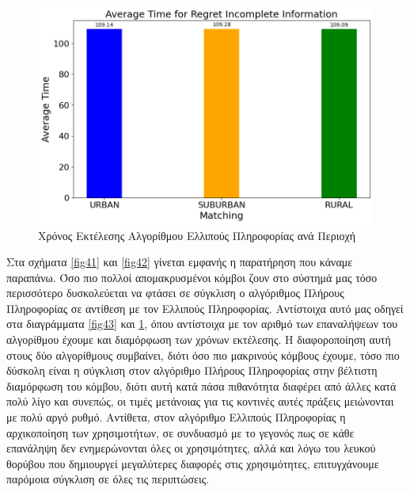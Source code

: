 \begin{figure}[H]
    \centering
    \includegraphics[width=\textwidth]{figures/chapter4/Average_Time_per_area_RII.png}
    \caption{Χρόνος Εκτέλεσης Αλγορίθμου Ελλιπούς Πληροφορίας ανά Περιοχή}
    \label{fig44}
\end{figure}

\newpage

Στα σχήματα \ref{fig41} και \ref{fig42} γίνεται εμφανής η παρατήρηση που κάναμε παραπάνω. Όσο πιο πολλοί απομακρυσμένοι κόμβοι ζουν στο σύστημά μας τόσο περισσότερο δυσκολεύεται να φτάσει σε σύγκλιση ο αλγόριθμος Πλήρους Πληροφορίας σε αντίθεση με τον Ελλιπούς Πληροφορίας. Αντίστοιχα αυτό μας οδηγεί στα διαγράμματα \ref{fig43} και \ref{fig44}, όπου αντίστοιχα με τον αριθμό των επαναλήψεων του αλγορίθμου έχουμε και διαμόρφωση των χρόνων εκτέλεσης. Η διαφοροποίηση αυτή στους δύο αλγορίθμους συμβαίνει, διότι όσο πιο μακρινούς κόμβους έχουμε, τόσο πιο δύσκολη είναι η σύγκλιση στον αλγόριθμο Πλήρους Πληροφορίας στην βέλτιστη διαμόρφωση του κόμβου, διότι αυτή κατά πάσα πιθανότητα διαφέρει από άλλες κατά πολύ λίγο και συνεπώς, οι τιμές μετάνοιας για τις κοντινές αυτές πράξεις μειώνονται με πολύ αργό ρυθμό. Αντίθετα, στον αλγόριθμο Ελλιπούς Πληροφορίας η αρχικοποίηση των χρησιμοτήτων, σε συνδυασμό με το γεγονός πως σε κάθε επανάληψη δεν ενημερώνονται όλες οι χρησιμότητες, αλλά και λόγω του λευκού θορύβου που δημιουργεί μεγαλύτερες διαφορές στις χρησιμότητες, επιτυγχάνουμε παρόμοια σύγκλιση σε όλες τις περιπτώσεις.

